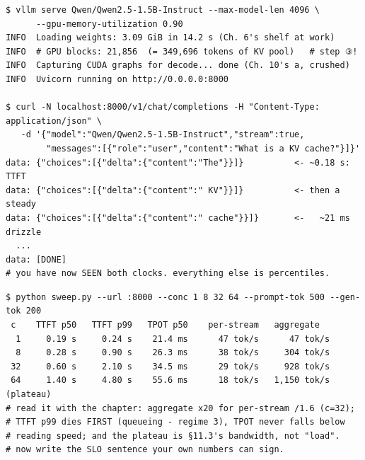 \begin{terminalbox}
\begin{Verbatim}[breaklines=true,breakanywhere=true,fontsize=\small,formatcom=\color{tbbtermfg},codes=\tbbcodeactive]
$ vllm serve Qwen/Qwen2.5-1.5B-Instruct --max-model-len 4096 \
      --gpu-memory-utilization 0.90
INFO  Loading weights: 3.09 GiB in 14.2 s (Ch. 6's shelf at work)
INFO  # GPU blocks: 21,856  (= 349,696 tokens of KV pool)   # step ③!
INFO  Capturing CUDA graphs for decode... done (Ch. 10's a, crushed)
INFO  Uvicorn running on http://0.0.0.0:8000

$ curl -N localhost:8000/v1/chat/completions -H "Content-Type: application/json" \
   -d '{"model":"Qwen/Qwen2.5-1.5B-Instruct","stream":true,
        "messages":[{"role":"user","content":"What is a KV cache?"}]}'
data: {"choices":[{"delta":{"content":"The"}}]}          <- ~0.18 s: TTFT
data: {"choices":[{"delta":{"content":" KV"}}]}          <- then a steady
data: {"choices":[{"delta":{"content":" cache"}}]}       <-   ~21 ms drizzle
  ...
data: [DONE]
# you have now SEEN both clocks. everything else is percentiles.
\end{Verbatim}
\end{terminalbox}

\begin{terminalbox}
\begin{Verbatim}[breaklines=true,breakanywhere=true,fontsize=\small,formatcom=\color{tbbtermfg},codes=\tbbcodeactive]
$ python sweep.py --url :8000 --conc 1 8 32 64 --prompt-tok 500 --gen-tok 200
 c    TTFT p50   TTFT p99   TPOT p50    per-stream   aggregate
  1     0.19 s     0.24 s    21.4 ms      47 tok/s      47 tok/s
  8     0.28 s     0.90 s    26.3 ms      38 tok/s     304 tok/s
 32     0.60 s     2.10 s    34.5 ms      29 tok/s     928 tok/s
 64     1.40 s     4.80 s    55.6 ms      18 tok/s   1,150 tok/s  (plateau)
# read it with the chapter: aggregate x20 for per-stream /1.6 (c=32);
# TTFT p99 dies FIRST (queueing - regime 3), TPOT never falls below
# reading speed; and the plateau is §11.3's bandwidth, not "load".
# now write the SLO sentence your own numbers can sign.
\end{Verbatim}
\end{terminalbox}

